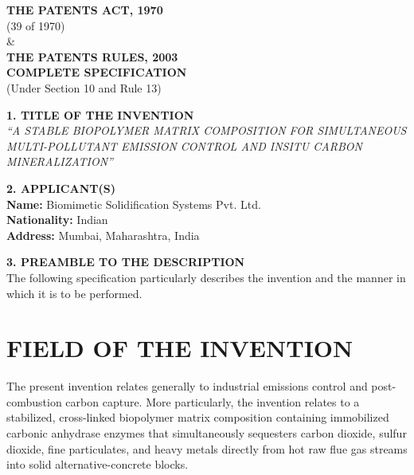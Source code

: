 \documentclass[12pt,a4paper]{article}
\begin{document}
\begin{center}
    \textbf{\large THE PATENTS ACT, 1970} \\
    (39 of 1970) \\
    \& \\
    \textbf{\large THE PATENTS RULES, 2003} \\
    \vspace{1cm}
    \textbf{\Large COMPLETE SPECIFICATION} \\
    (Under Section 10 and Rule 13) \\
    \vspace{2cm}
    
    \textbf{\large 1. TITLE OF THE INVENTION} \\
    \vspace{0.5cm}
    \textit{``A STABLE BIOPOLYMER MATRIX COMPOSITION FOR SIMULTANEOUS MULTI-POLLUTANT EMISSION CONTROL AND INSITU CARBON MINERALIZATION''} \\
    \vspace{2.5cm}
    
    \textbf{\large 2. APPLICANT(S)} \\
    \vspace{0.5cm}
    \textbf{Name:} Biomimetic Solidification Systems Pvt. Ltd. \\
    \textbf{Nationality:} Indian \\
    \textbf{Address:} Mumbai, Maharashtra, India \\
    \vspace{2.5cm}
    
    \textbf{\large 3. PREAMBLE TO THE DESCRIPTION} \\
    \vspace{0.5cm}
    The following specification particularly describes the invention and the manner in which it is to be performed.
\end{center}

\newpage

\section*{FIELD OF THE INVENTION}
The present invention relates generally to industrial emissions control and post-combustion carbon capture. More particularly, the invention relates to a stabilized, cross-linked biopolymer matrix composition containing immobilized carbonic anhydrase enzymes that simultaneously sequesters carbon dioxide, sulfur dioxide, fine particulates, and heavy metals directly from hot raw flue gas streams into solid alternative-concrete blocks.
\end{document}
